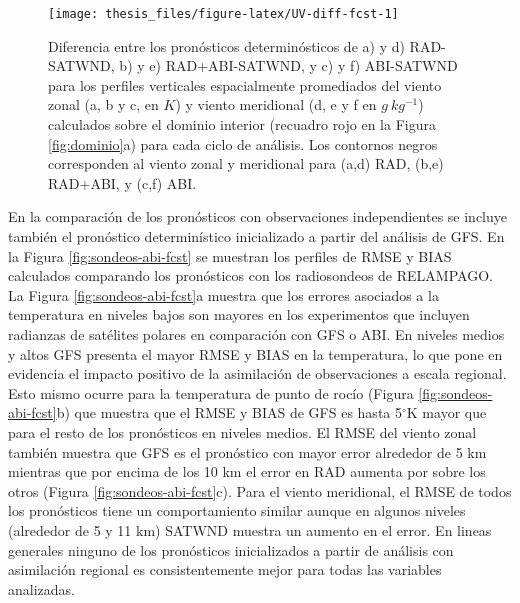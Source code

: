 \documentclass[12pt,oneside,a4paper]{reedthesis}
\begin{document}
\begin{figure}

{\centering \texttt{[image: thesis\_files/figure-latex/UV-diff-fcst-1]} 

}

\caption{Diferencia entre los pronósticos determinósticos de a) y d) RAD-SATWND, b) y e) RAD+ABI-SATWND, y c) y f) ABI-SATWND para los perfiles verticales espacialmente promediados del viento zonal (a, b y c, en \(K\)) y viento meridional (d, e y f en \(g\ kg^{-1}\)) calculados sobre el dominio interior (recuadro rojo en la Figura \ref{fig:dominio}a) para cada ciclo de análisis. Los contornos negros corresponden al viento zonal y meridional para (a,d) RAD, (b,e) RAD+ABI, y (c,f) ABI.}\label{fig:UV-diff-fcst}
\end{figure}
En la comparación de los pronósticos con observaciones independientes se incluye también el pronóstico determinístico inicializado a partir del análisis de GFS. En la Figura \ref{fig:sondeos-abi-fcst} se muestran los perfiles de RMSE y BIAS calculados comparando los pronósticos con los radiosondeos de RELAMPAGO. La Figura \ref{fig:sondeos-abi-fcst}a muestra que los errores asociados a la temperatura en niveles bajos son mayores en los experimentos que incluyen radianzas de satélites polares en comparación con GFS o ABI. En niveles medios y altos GFS presenta el mayor RMSE y BIAS en la temperatura, lo que pone en evidencia el impacto positivo de la asimilación de observaciones a escala regional. Esto mismo ocurre para la temperatura de punto de rocío (Figura \ref{fig:sondeos-abi-fcst}b) que muestra que el RMSE y BIAS de GFS es hasta 5\(^\circ\)K mayor que para el resto de los pronósticos en niveles medios. El RMSE del viento zonal también muestra que GFS es el pronóstico con mayor error alrededor de 5 km mientras que por encima de los 10 km el error en RAD aumenta por sobre los otros (Figura \ref{fig:sondeos-abi-fcst}c). Para el viento meridional, el RMSE de todos los pronósticos tiene un comportamiento similar aunque en algunos niveles (alrededor de 5 y 11 km) SATWND muestra un aumento en el error. En lineas generales ninguno de los pronósticos inicializados a partir de análisis con asimilación regional es consistentemente mejor para todas las variables analizadas.
\end{document}
